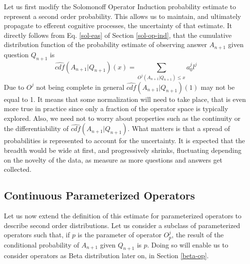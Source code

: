 \documentclass[runningheads]{llncs}
\begin{document}
Let us first modify the Solomonoff Operator Induction probability
estimate to represent a second order probability. This allows us to
maintain, and ultimately propagate to efferent cognitive processes,
the uncertainty of that estimate.
It directly follows from Eq. \ref{sol-eas} of Section
\ref{sol-op-ind}, that the cumulative distribution function of the
probability estimate of observing answer $A_{n+1}$ given question
$Q_{n+1}$ is
\begin{equation}
  \label{sol-cdf}
\hat{cdf}(A_{n+1}|Q_{n+1})(x) = \sum_{O^j(A_{n+1}|Q_{n+1}) \le x} a_0^j l^j
\end{equation}
Due to $O^j$ not being complete in general
$\hat{cdf}(A_{n+1}|Q_{n+1})(1)$ may not be equal to 1. It means that
some normalization will need to take place, that is even more true in
practice since only a fraction of the operator space is typically
explored. Also, we need not to worry about properties such as the
continuity or the differentiability of
$\hat{cdf}(A_{n+1}|Q_{n+1})$. What matters is that a spread of
probabilities is represented to account for the uncertainty. It is
expected that the breadth would be wide at first, and progressively
shrinks, fluctuating depending on the novelty of the data, as measure
as more questions and answers get collected.

\subsection{Continuous Parameterized Operators}
Let us now extend the definition of this estimate for parameterized
operators to describe second order distributions. Let us consider a
subclass of parameterized operators such that, if $p$ is the parameter
of operator $O^j_p$, the result of the conditional probability of
$A_{n+1}$ given $Q_{n+1}$ is $p$. Doing so will enable us to consider
operators as Beta distribution later on, in Section \ref{beta-op}.
\end{document}
